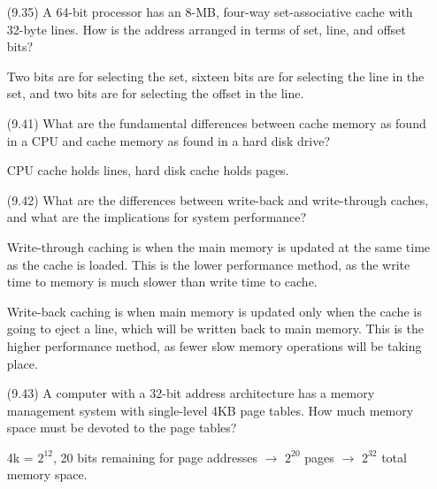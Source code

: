 \documentclass[letterpaper,10pt,titlepage]{article}
\begin{document}
\begin{enumerate}
	\item[(9.35)] A 64-bit processor has an 8-MB, four-way set-associative cache with
		32-byte lines. How is the address arranged in terms of set, line, and
		offset bits?
	\item[\textbullet] Two bits are for selecting the set, sixteen bits are for
		selecting the line in the set, and two bits are for selecting the offset
		in the line.

	\item[(9.41)] What are the fundamental differences between cache memory as found
		in a CPU and cache memory as found in a hard disk drive?
	\item[\textbullet] CPU cache holds lines, hard disk cache holds pages.

	\item[(9.42)] What are the differences between write-back and write-through
		caches, and what are the implications for system performance?
	\item[\textbullet] Write-through caching is when the main memory is updated at the
		same time as the cache is loaded. This is the lower performance method, as
		the write time to memory is much slower than write time to cache.
	\item[\textbullet] Write-back caching is when main memory is updated only when the
		cache is going to eject a line, which will be written back to main memory.
		This is the higher performance method, as fewer slow memory operations
		will be taking place.

	\item[(9.43)] A computer with a 32-bit address architecture has a memory
		management system with single-level 4KB page tables. How much memory space
		must be devoted to the page tables?
	\item[\textbullet] 4k = $2^{12}$, 20 bits remaining for page addresses
		$\rightarrow$ $2^{20}$ pages $\rightarrow$ $2^{32}$ total memory space.


\end{enumerate}
\end{document}
